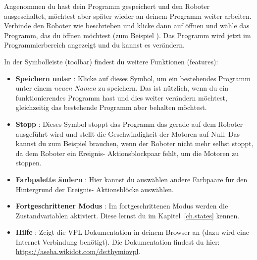 
Angenommen du hast dein Programm gespeichert und den Roboter ausgeschaltet,
möchtest aber später wieder an deinem Programm weiter arbeiten. Verbinde den
Roboter wie beschrieben und klicke dann auf öffnen  und wähle das
Programm, das du öffnen möchtest (zum Beispiel ). Das Programm
wird jetzt im Programmierbereich angezeigt und du kannst es verändern.


In der Symbolleiste (toolbar) findest du weitere Funktionen (features):

\begin{itemize}

\item \textbf{Speichern unter} : Klicke auf dieses Symbol, um ein bestehendes
    Programm unter einem \emph{neuen Namen} zu speichern. Das ist nützlich, wenn du ein funktionierendes Programm hast und dies weiter verändern möchtest, gleichzeitig das bestehende Programm aber behalten möchtest.
    
\item \textbf{Stopp} : Dieses Symbol stoppt das Programm das gerade
    auf dem Roboter ausgeführt wird und stellt die Geschwindigkeit der Motoren auf Null. Das kannst du zum Beispiel brauchen, wenn
    der Roboter nicht mehr selbst stoppt, da dem Roboter ein Ereignis- Aktionsblockpaar fehlt, um die Motoren zu stoppen.
\item \textbf{Farbpalette ändern} : Hier kannst du auswählen andere Farbpaare für den Hintergrund der Ereignis- Aktionsblöcke auswählen.

\item \textbf{Fortgeschrittener Modus} : Im fortgeschrittenen
    Modus werden die Zustandvariablen aktiviert. Diese lernst du im
    Kapitel~\ref{ch.states} kennen.

\item \textbf{Hilfe} : Zeigt die VPL Dokumentation in deinem Browser
    an (dazu wird eine Internet Verbindung benötigt). Die Dokumentation findest du hier: 
    \url{https://aseba.wikidot.com/de:thymiovpl}.
\end{itemize}
